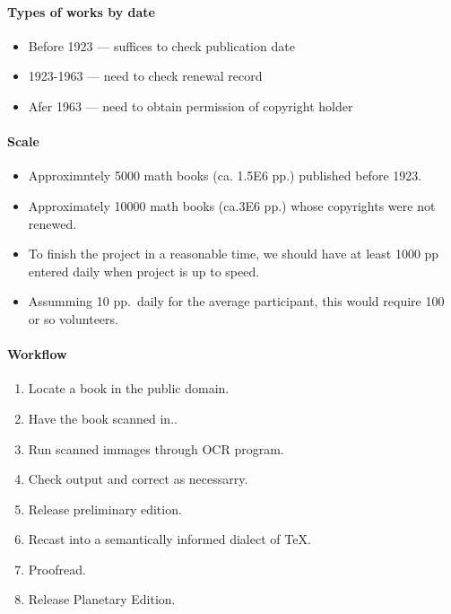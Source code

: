\begin{itemize}
\begin{itemize}
\paragraph{Types of works by date}

\begin{itemize}
\item
  Before 1923 --- suffices to check publication date
\item
  1923-1963 --- need to check renewal record
\item
  Afer 1963 --- need to obtain permission of copyright holder
\end{itemize}

\paragraph{Scale}

\begin{itemize}
\item
  Approximntely 5000 math books (ca. 1.5E6 pp.) published before 1923.
\item
  Approximately 10000 math books (ca.3E6 pp.) whose copyrights were not
  renewed.
\item
  To finish the project in a reasonable time, we should have at least
  1000 pp entered daily when project is up to speed.
\item
  Assumming 10 pp.~daily for the average participant, this would require
  100 or so volunteers.
\end{itemize}

\paragraph{Workflow}

\begin{enumerate}
\item Locate a book in the public domain. 
\item Have the book scanned in.. 
\item Run scanned immages through OCR program. 
\item Check output and correct as necessarry. 
\item Release preliminary edition. 
\item Recast into a semantically informed dialect of TeX. 
\item Proofread. 
\item Release Planetary Edition.
\end{enumerate}


\end{itemize}
\end{itemize}
